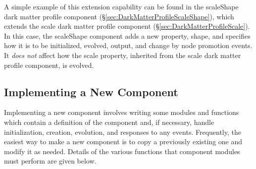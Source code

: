 A simple example of this extension capability can be found in the {\normalfont \ttfamily scaleShape} dark matter profile component (\S\ref{sec:DarkMatterProfileScaleShape}), which extends the {\normalfont \ttfamily scale} dark matter profile component (\S\ref{sec:DarkMatterProfileScale}). In this case, the {\normalfont \ttfamily scaleShape} component adds a new property, {\normalfont \ttfamily shape}, and specifies how it is to be initialized, evolved, output, and change by node promotion events. It \emph{does not} affect how the {\normalfont \ttfamily scale} property, inherited from the {\normalfont \ttfamily scale} dark matter profile component, is evolved.

\subsection{Implementing a New Component}\label{sec:ComponentImplement}

Implementing a new component involves writing some modules and functions which contain a definition of the component and, if necessary, handle initialization, creation, evolution, and responses to any events. Frequently, the easiest way to make a new component is to copy a previously existing one and modify it as needed. Details of the various functions that component modules must perform are given below.

